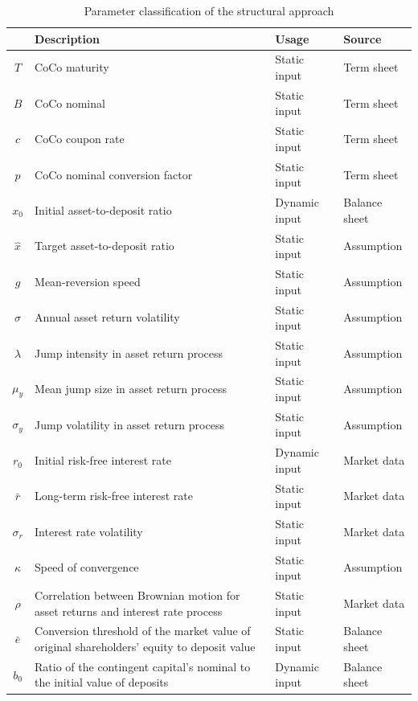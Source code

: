 \begin{table}[H]
	\setlength{\extrarowheight}{2.5pt}
	\centering
	\begin{tabular}{cp{8cm}ll}
		\toprule
			 & Description & Usage & Source \\
		\midrule
			$T$ & CoCo maturity & Static input & Term sheet\\
			$B$ & CoCo nominal & Static input & Term sheet \\
			$c$ & CoCo coupon rate & Static input & Term sheet\\ 
			$p$ & CoCo nominal conversion factor & Static input & Term sheet \\
			$x_0$ &Initial asset-to-deposit ratio & Dynamic input & Balance sheet\\
			$\hat{x}$ & Target asset-to-deposit ratio & Static input & Assumption \\
			$g$ & Mean-reversion speed & Static input & Assumption  \\
			$\sigma$ & Annual asset return volatility & Static input & Assumption \\
			$\lambda$ & Jump intensity in asset return process & Static input  &  Assumption  \\			
			$\mu_y$ & Mean jump size in asset return process & Static input & Assumption\\
			$\sigma_y$ & Jump volatility in asset return process & Static input & Assumption \\		
			$r_0$ & Initial risk-free interest rate & Dynamic input & Market data \\
			$\bar{r}$ & Long-term risk-free interest rate & Static input & Market data\\
			$\sigma_r$ &Interest rate volatility & Static input &  Market data \\
			$\kappa$ & Speed of convergence & Static input & Assumption \\
			$\rho$ & Correlation between Brownian motion for asset returns and interest rate process  & Static input & Market data \\ %
			$\bar{e}$ & Conversion threshold of the market value of original shareholders' equity to deposit value & Static input & Balance sheet \\
			$b_0$ & Ratio of the contingent capital's nominal to the initial value of deposits & Dynamic input & Balance sheet \\
		\bottomrule
	\end{tabular}
	\caption[Parameter classification of the structural approach]{Parameter classification of the structural approach \citep{wilkens2014contingent}}
\end{table}

